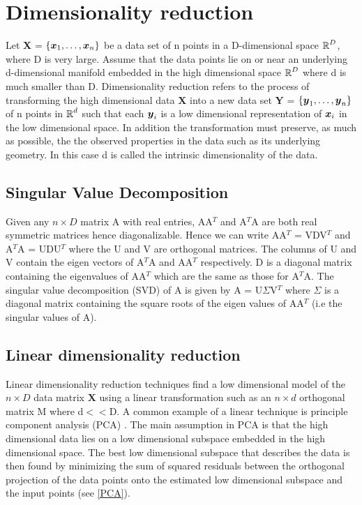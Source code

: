 \section{Dimensionality reduction}
Let \textbf{X} = $\displaystyle \{\boldsymbol{x}_{1}, \ldots , \boldsymbol{x}_{n} \}$
be a data set of n points in a D-dimensional space $\operatorname{\mathbb{R}}^{D}$, where D is very large.
Assume that the data points lie on or near an underlying d-dimensional manifold embedded in the high dimensional space $\operatorname{\mathbb{R}}^{D}$ where d is much smaller than D.
Dimensionality reduction refers to the process of transforming the high dimensional data 
$\textbf{X}$ into a new data set \textbf{Y} = $\displaystyle \{ \boldsymbol{y}_{1}, \ldots, \boldsymbol{y}_{n} \}$  of n points in $\operatorname{\mathbb{R}}^{d}$ such that each $\boldsymbol{y}_{i}$ is a low dimensional representation of  $\boldsymbol{x}_{i}$ in the low dimensional space. In addition the transformation must preserve, as much as possible,  the the observed properties in the data such as its underlying geometry. In this case d  is called the intrinsic  dimensionality of the data. 

\subsection{Singular Value Decomposition}
Given any $n \times D$ matrix A with real entries, AA$^{T}$ and A$^{T}$A are 
both real symmetric matrices hence diagonalizable. Hence we can write AA$^{T}$ = VDV$^{T}$ and A$^{T}$A = UDU$^{T}$ where the U and V are orthogonal matrices. The columns of U and V contain the eigen vectors of A$^{T}$A  and AA$^{T}$ respectively. D is a diagonal matrix containing the eigenvalues of AA$^{T}$ which are the same as those for A$^{T}$A. The singular value decomposition (SVD) of A is given by A = U$\Sigma$V$^{T}$ where  $\Sigma$ is a diagonal matrix containing the square roots of the eigen values  of AA$^{T}$ (i.e the singular values of A).


\subsection{Linear dimensionality reduction}
Linear dimensionality reduction techniques find a low dimensional model of the $n \times D$
data matrix $\textbf{X}$ using a linear transformation such as an $n \times d$ orthogonal matrix M where d$<<$D. A common example of a linear technique is principle component analysis (PCA) \cite{JolliffeIT1986PCAa}.
The main assumption in PCA is that the high dimensional data lies on a low dimensional
subspace embedded in the high dimensional space. The best low dimensional subspace that describes the data is then found by minimizing the sum of squared residuals between the orthogonal projection of the data  points onto the estimated low dimensional subspace and the input points (see \eqref{PCA}).



